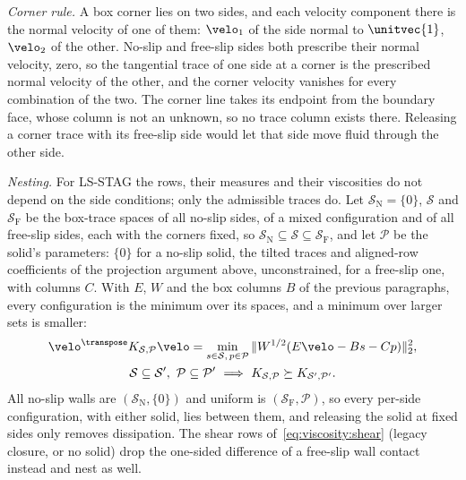 \emph{Corner rule.} A box corner lies on two sides, and each velocity
component there is the normal velocity of one of them: $\velo_1$ of the side
normal to $\unitvec{1}$, $\velo_2$ of the other. No-slip and free-slip sides
both prescribe their normal velocity, zero, so the tangential trace of one
side at a corner is the prescribed normal velocity of the other, and the
corner velocity vanishes for every combination of the two. The corner line
takes its endpoint from the boundary face, whose column is not an unknown,
so no trace column exists there. Releasing a corner trace with its
free-slip side would let that side move fluid through the other side.

\emph{Nesting.} For LS-STAG the rows, their measures and their viscosities
do not depend on the side conditions; only the admissible traces do. Let
$\mathcal S_{\mathrm N}=\{0\}$, $\mathcal S$ and $\mathcal S_{\mathrm F}$ be
the box-trace spaces of all no-slip sides, of a mixed configuration and of
all free-slip sides, each with the corners fixed, so
$\mathcal S_{\mathrm N}\subseteq\mathcal S\subseteq\mathcal S_{\mathrm F}$,
and let $\mathcal P$ be the solid's parameters: $\{0\}$ for a no-slip solid,
the tilted traces and aligned-row coefficients of the projection argument
above, unconstrained, for a free-slip one, with columns $C$. With $E$, $W$
and the box columns $B$ of the previous paragraphs, every configuration is
the minimum over its spaces, and a minimum over larger sets is smaller:
\begin{equation}\label{eq:viscosity:per-side-nesting}
  \begin{gathered}
  \velo^{\transpose}K_{\mathcal S,\mathcal P}\velo
  =\min_{s\in\mathcal S,\,p\in\mathcal P}\|W^{1/2}(E\velo-Bs-Cp)\|_2^2,\\
  \mathcal S\subseteq\mathcal S',\ \mathcal P\subseteq\mathcal P'
  \ \Longrightarrow\ K_{\mathcal S,\mathcal P}\succeq K_{\mathcal S',\mathcal P'}.
  \end{gathered}
\end{equation}
All no-slip walls are $(\mathcal S_{\mathrm N},\{0\})$ and uniform
\code{()} is $(\mathcal S_{\mathrm F},\mathcal P)$, so every
per-side configuration, with either solid, lies between them, and releasing
the solid at fixed sides only removes dissipation. The shear rows
of~\cref{eq:viscosity:shear} (legacy closure, or no solid) drop the one-sided
difference of a free-slip wall contact instead and nest as well.
